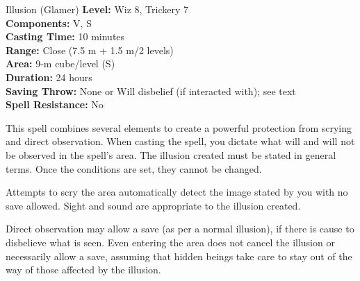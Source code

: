 {Illusion (Glamer)}
{
	\textbf{Level:}
	Wiz 8, Trickery 7\\
	\textbf{Components:}
	V, S\\
	\textbf{Casting Time:}
	10 minutes\\
	\textbf{Range:}
	Close (7.5 m + 1.5 m/2 levels)\\
	\textbf{Area:}
	9-m cube/level (S)\\
	\textbf{Duration:}
	24 hours\\
	\textbf{Saving Throw:}
	None or Will disbelief (if interacted with); see text\\
	\textbf{Spell Resistance:}
	No\\
}
{
	This spell combines several elements to create a powerful protection from scrying and direct observation. When casting the spell, you dictate what will and will not be observed in the spell's area. The illusion created must be stated in general terms. Once the conditions are set, they cannot be changed.

	Attempts to scry the area automatically detect the image stated by you with no save allowed. Sight and sound are appropriate to the illusion created.

	Direct observation may allow a save (as per a normal illusion), if there is cause to disbelieve what is seen. Even entering the area does not cancel the illusion or necessarily allow a save, assuming that hidden beings take care to stay out of the way of those affected by the illusion.

}

